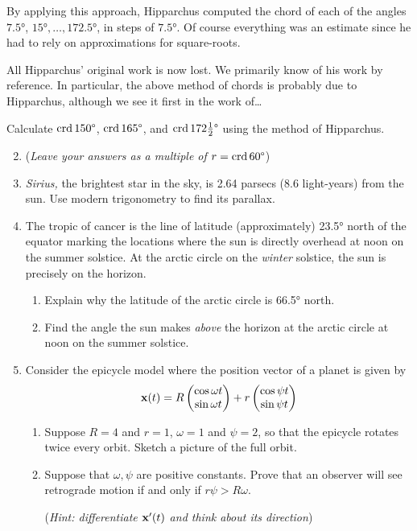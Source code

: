 By applying this approach, Hipparchus computed the chord of each of the angles $\ang{7.5}$, $\ang{15},\ldots,\ang{172.5}$, in steps of $\ang{7.5}$. Of course everything was an estimate since he had to rely on approximations for square-roots.\smallbreak

All Hipparchus' original work is now lost. We primarily know of his work by reference. In particular, the above method of chords is probably due to Hipparchus, although we see it first in the work of\ldots



\begin{exercises}{}{}
\exstart %
  Calculate $\crd\ang{150}$, $\crd\ang{165}$, and $\crd\ang{172\tfrac 12}$ using the method of Hipparchus.\vspace{-5pt}
\begin{enumerate}\setcounter{enumi}{1}
  \item[](\emph{Leave your answers as a multiple of $r=\crd\ang{60}$})
  
  \item \emph{Sirius,} the brightest star in the sky, is 2.64 parsecs (8.6 light-years) from the sun. Use modern trigonometry to find its parallax.

	\item\label{exs:tropicstick1} The tropic of cancer is the line of latitude (approximately) \ang{23.5} north of the equator marking the locations where the sun is directly overhead at noon on the summer solstice.\footnotemark{} At the arctic circle on the \emph{winter} solstice, the sun is precisely on the horizon.
	\begin{enumerate}
	  \item Explain why the latitude of the arctic circle is \ang{66.5} north.
	  \item Find the angle the sun makes \emph{above} the horizon at the arctic circle at noon on the summer solstice.
	\end{enumerate}
  
  \item Consider the epicycle model where the position vector of a planet is given by
  \[\vx(t)=R\twovec{\cos \omega t}{\sin \omega t}+r\twovec{\cos \psi t}{\sin \psi t}\]
  \begin{enumerate}
    \item Suppose $R=4$ and $r=1$, $\omega=1$ and $\psi=2$, so that the epicycle rotates twice every orbit. Sketch a picture of the full orbit.
    \item Suppose that $\omega,\psi$ are positive constants. Prove that an observer will see retrograde motion if and only if $r\psi>R\omega$.\par
  	(\emph{Hint: differentiate $\vx'(t)$ and think about its direction})
  \end{enumerate}
\end{enumerate}
\end{exercises}


